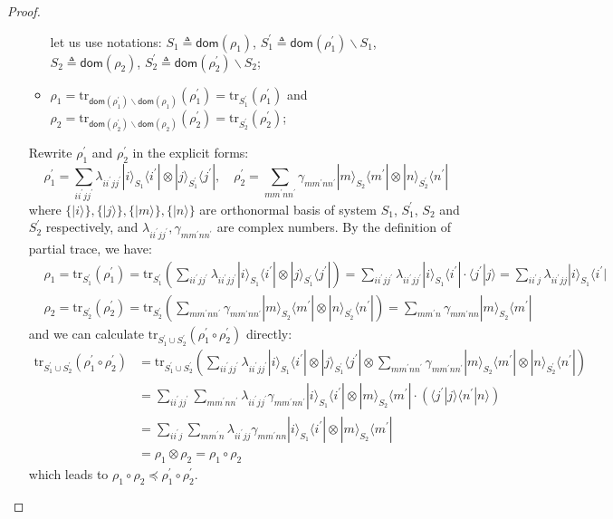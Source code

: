 \documentclass[conference,compsoc, 10pt]{IEEEtran}
\newcommand {\dom }[1] {{\mathsf{dom}\!\left(#1\right)}}
\newcommand {\tr } {{\mathrm{tr}}}
\def\>{\ensuremath{\rangle}}
\def\<{\ensuremath{\langle}}
\begin{document}
\begin{appendices}
\begin{proof}
\begin{itemize}
\begin{itemize}
					let us use notations: $S_1 \triangleq \dom{\rho_1}$, $S_1^\prime \triangleq \dom{\rho_1^\prime}\backslash S_1$, $S_2 \triangleq \dom{\rho_2}$, $S_2^\prime \triangleq \dom{\rho_2^\prime}\backslash S_2$;
					\item $\rho_1 = \tr_{\dom{\rho_1^\prime}\backslash\dom{\rho_1}}(\rho_1^\prime) = \tr_{S_1^\prime}(\rho_1^\prime)$ and $\rho_2 = \tr_{\dom{\rho_2^\prime}\backslash\dom{\rho_2}}(\rho_2^\prime) = \tr_{S_2^\prime}(\rho_2^\prime)$;
				\end{itemize}
				Rewrite $\rho_1^\prime$ and  $\rho_2^\prime$ in the explicit forms:
				$$\rho_1^\prime = \sum_{ii^\prime jj^\prime}\lambda_{ii^\prime jj^\prime}|i\>_{S_1}\<i^\prime|\otimes|j\>_{S_1^\prime}\<j^\prime|, \quad \rho_2^\prime = \sum_{mm^\prime nn^\prime}\gamma_{mm^\prime nn^\prime}|m\>_{S_2}\<m^\prime|\otimes|n\>_{S_2^\prime}\<n^\prime|$$
				where $\{|i\>\}, \{|j\>\},\{|m\>\},\{|n\>\}$ are orthonormal basis of system $S_1$, $S_1^\prime$, $S_2$ and $S_2^\prime$ respectively, and $\lambda_{ii^\prime jj^\prime}, \gamma_{mm^\prime nn^\prime}$ are complex numbers. By the definition of partial trace, we have:
				\begin{align*}
				&\rho_1 = \tr_{S_1^\prime}(\rho_1^\prime) = \tr_{S_1^\prime}\left(\sum_{ii^\prime jj^\prime}\lambda_{ii^\prime jj^\prime}|i\>_{S_1}\<i^\prime|\otimes|j\>_{S_1^\prime}\<j^\prime|\right) = \sum_{ii^\prime jj^\prime}\lambda_{ii^\prime jj^\prime}|i\>_{S_1}\<i^\prime|\cdot\<j^\prime|j\> = \sum_{ii^\prime j}\lambda_{ii^\prime jj}|i\>_{S_1}\<i^\prime| \\
				&\rho_2 = \tr_{S_2^\prime}(\rho_2^\prime) = \tr_{S_2^\prime}\left(\sum_{mm^\prime nn^\prime}\gamma_{mm^\prime nn^\prime}|m\>_{S_2}\<m^\prime|\otimes|n\>_{S_2^\prime}\<n^\prime|\right) = \sum_{mm^\prime n}\gamma_{mm^\prime nn}|m\>_{S_2}\<m^\prime|
				\end{align*}
				and we can calculate $\tr_{S_1^\prime\cup S_2^\prime}(\rho_1^\prime\circ\rho_2^\prime)$ directly:
				\begin{align*}
				\tr_{S_1^\prime\cup S_2^\prime}(\rho_1^\prime\circ\rho_2^\prime) &= \tr_{S_1^\prime\cup S_2^\prime}\left(\sum_{ii^\prime jj^\prime}\lambda_{ii^\prime jj^\prime}|i\>_{S_1}\<i^\prime|\otimes|j\>_{S_1^\prime}\<j^\prime| \otimes  \sum_{mm^\prime nn^\prime}\gamma_{mm^\prime nn^\prime}|m\>_{S_2}\<m^\prime|\otimes|n\>_{S_2^\prime}\<n^\prime|\right) \\
				&= \sum_{ii^\prime jj^\prime}\sum_{mm^\prime nn^\prime}\lambda_{ii^\prime jj^\prime}\gamma_{mm^\prime nn^\prime}|i\>_{S_1}\<i^\prime|\otimes|m\>_{S_2}\<m^\prime|\cdot \left(\<j^\prime|j\>\<n^\prime|n\>\right) \\
				&= \sum_{ii^\prime j}\sum_{mm^\prime n}\lambda_{ii^\prime jj}\gamma_{mm^\prime nn}|i\>_{S_1}\<i^\prime|\otimes|m\>_{S_2}\<m^\prime| \\
				&= \rho_1\otimes\rho_2 = \rho_1\circ\rho_2
				\end{align*}
				which leads to $\rho_1\circ\rho_2\preceq\rho_1^\prime\circ\rho_2^\prime$.
			\end{itemize}
		\end{proof}
		

\end{appendices}
\end{document}
